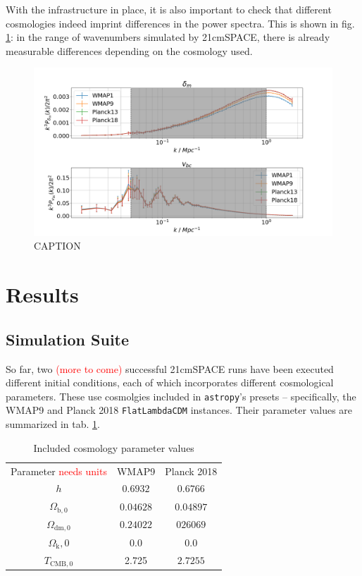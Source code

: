 \documentclass[floats,floatfix,showpacs,amssymb,prd,superscriptaddress,nofootinbib]{revtex4-2} %
\newcommand{\code}{\texttt}
\newcommand{\red}{\textcolor{red}}
\begin{document}
With the infrastructure in place, it is also important to check that different cosmologies indeed imprint differences in the power spectra. This is shown in fig. \ref{fig:compare_cosmologies_averaged_IC_power_spectra}: in the range of wavenumbers simulated by 21cmSPACE, there is already measurable differences depending on the cosmology used.

\begin{figure}[H]
    \centering
    \includegraphics[width=0.9\columnwidth]{images/ic_power_spectra/compare_cosmologies_averaged_power_spectra.png}
    \caption{CAPTION}
    \label{fig:compare_cosmologies_averaged_IC_power_spectra}
\end{figure}

\newpage
\section{Results}
\subsection{Simulation Suite}
So far, two \red{(more to come)} successful 21cmSPACE runs have been executed different initial conditions, each of which incorporates different cosmological parameters. These use cosmolgies included in \code{astropy}'s presets -- specifically, the WMAP9 and Planck 2018 \code{FlatLambdaCDM} instances. Their parameter values are summarized in tab. \ref{tab:astropy_cosmology_parameter_values}.

\begin{table}[!h]
    \centering
    \begin{tabular}{|c|c|c|}
        \hline
        Parameter \red{needs units} & WMAP9 & Planck 2018\\ \hhline{|=|=|=|}
        $h$ & $0.6932$ & $0.6766$\\ \hline
        $\Omega_{\text{b}, 0}$ & $0.04628$ & $0.04897$\\ \hline
        $\Omega_{\text{dm}, 0}$ & $0.24022$ & $026069$\\ \hline
        $\Omega_{\text{k}}, 0$ & $0.0$ & $0.0$\\ \hline
        $T_{\text{CMB},0}$ & 2.725 & $2.7255$\\ \hline
    \end{tabular}
    \caption{Included cosmology parameter values}
    \label{tab:astropy_cosmology_parameter_values}
\end{table}
\end{document}
